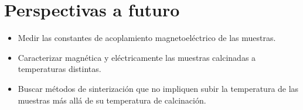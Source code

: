 \documentclass[../main.tex]{subfiles}
\begin{document}
\section{Perspectivas a futuro}
\begin{itemize}
    \item Medir las constantes de acoplamiento magnetoeléctrico de las muestras.
    \item Caracterizar magnética y eléctricamente las muestras calcinadas a temperaturas distintas.
    \item Buscar métodos de sinterización que no impliquen subir la temperatura de las muestras más allá de su temperatura de calcinación.
\end{itemize}
\end{document}
